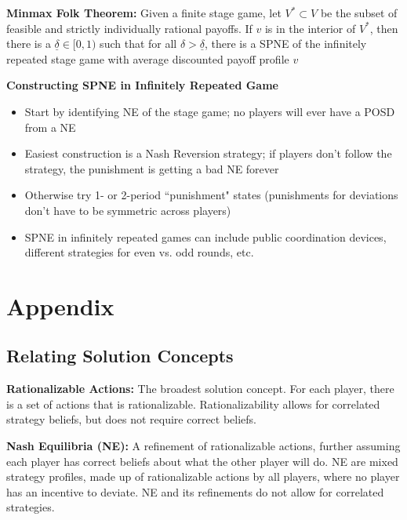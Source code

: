 \documentclass{report}
\renewcommand{\chaptermark}[1]{\markboth{#1}{}}
\newcommand{\FlowerSmall}{\mbox{\raisebox{-1pt}{\small\EightFlowerPetalRemoved}}} %
\begin{document}
\textbf{Minmax Folk Theorem:} Given a finite stage game, let $V^* \subset V$ be the subset of feasible and strictly individually rational payoffs. If $v$ is in the interior of $V^*$, then there is a $\underline{\delta} \in [0,1)$ such that for all $\delta > \underline{\delta}$, there is a SPNE of the infinitely repeated stage game with average discounted payoff profile $v$


\bigskip
\begin{mdframed}
	\medskip
	\begin{center} \textbf{{\large Constructing SPNE in Infinitely Repeated Game}} \end{center}
	\begin{itemize}[label=\FlowerSmall]
		\item Start by identifying NE of the stage game; no players will ever have a POSD from a NE
		\item Easiest construction is a Nash Reversion strategy; if players don't follow the strategy, the punishment is getting a bad NE forever
		\item Otherwise try 1- or 2-period ``punishment" states (punishments for deviations don't have to be symmetric across players)
		\item SPNE in infinitely repeated games can include public coordination devices, different strategies for even vs. odd rounds, etc.
	\end{itemize}
	\smallskip
\end{mdframed}
\bigskip




\chapter*{Appendix}
\thispagestyle{fancy}
\chaptermark{Appendix} \bigskip

\section*{Relating Solution Concepts}\medskip

\textbf{Rationalizable Actions:} The broadest solution concept. For each player, there is a set of actions that is rationalizable. Rationalizability allows for correlated strategy beliefs, but does not require correct beliefs. \bigskip \bigskip

\textbf{Nash Equilibria (NE):} A refinement of rationalizable actions, further assuming each player has correct beliefs about what the other player will do. NE are mixed strategy profiles, made up of rationalizable actions by all players, where no player has an incentive to deviate. NE and its refinements do not allow for correlated strategies. \bigskip \bigskip
\end{document}
